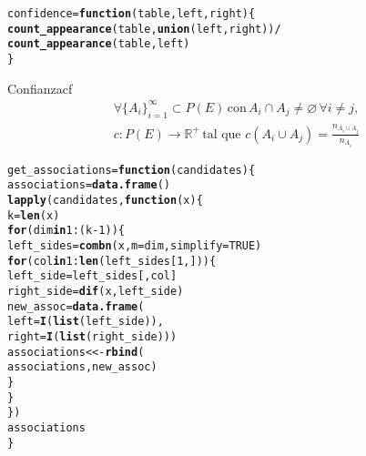 \documentclass[12pt]{report}\usepackage[]{graphicx}\usepackage[dvipsnames]{xcolor}
\makeatletter
\newcommand{\hlnum}[1]{\textcolor[rgb]{0.686,0.059,0.569}{#1}}%
\newcommand{\hlopt}[1]{\textcolor[rgb]{0,0,0}{#1}}%
\newcommand{\hlstd}[1]{\textcolor[rgb]{0.345,0.345,0.345}{#1}}%
\newcommand{\hlkwa}[1]{\textcolor[rgb]{0.161,0.373,0.58}{\textbf{#1}}}%
\newcommand{\hlkwb}[1]{\textcolor[rgb]{0.69,0.353,0.396}{#1}}%
\newcommand{\hlkwc}[1]{\textcolor[rgb]{0.333,0.667,0.333}{#1}}%
\newcommand{\hlkwd}[1]{\textcolor[rgb]{0.737,0.353,0.396}{\textbf{#1}}}%
\newenvironment{kframe}{%
 \def\at@end@of@kframe{}%
 \ifinner\ifhmode%
  \def\at@end@of@kframe{\end{minipage}}%
  \begin{minipage}{\columnwidth}%
 \fi\fi%
 \def\FrameCommand##1{\hskip\@totalleftmargin \hskip-\fboxsep
 \colorbox{shadecolor}{##1}\hskip-\fboxsep
     \hskip-\linewidth \hskip-\@totalleftmargin \hskip\columnwidth}%
 \MakeFramed {\advance\hsize-\width
   \@totalleftmargin\z@ \linewidth\hsize
   \@setminipage}}%
 {\par\unskip\endMakeFramed%
 \at@end@of@kframe}
\newenvironment{knitrout}{}{} %
\makeatother
\begin{document}
\begin{knitrout}
\color{fgcolor}\begin{kframe}
\begin{alltt}
\hlstd{confidence} \hlkwb{=} \hlkwa{function}\hlstd{(}\hlkwc{table}\hlstd{,} \hlkwc{left}\hlstd{,} \hlkwc{right}\hlstd{) \{}
        \hlkwd{count_appearance}\hlstd{(table,} \hlkwd{union}\hlstd{(left, right))} \hlopt{/}
        \hlkwd{count_appearance}\hlstd{(table, left)}
\hlstd{\}}
\end{alltt}
\end{kframe}
\end{knitrout}
			
			\begin{definicion}{Confianza}{cf}
				\begin{equation*}
					\begin{gathered}
						\forall\{A_i\}_{i=1}^\infty \subset P(E) \, \text{con} \, A_i \cap A_j \neq \varnothing \, \forall i \neq j, \\
						c: P(E) \longrightarrow \mathbb{R}^+ \, \text{tal que} \,\, c(A_i \cup A_j) = \frac{n_{A_i \cup A_j}}{n_{A_i}}
					\end{gathered}
				\end{equation*}
			\end{definicion}
			
\begin{knitrout}
\color{fgcolor}\begin{kframe}
\begin{alltt}
\hlstd{get_associations} \hlkwb{=} \hlkwa{function}\hlstd{(}\hlkwc{candidates}\hlstd{) \{}
        \hlstd{associations} \hlkwb{=} \hlkwd{data.frame}\hlstd{()}
        \hlkwd{lapply}\hlstd{(candidates,} \hlkwa{function}\hlstd{(}\hlkwc{x}\hlstd{) \{}
                \hlstd{k} \hlkwb{=} \hlkwd{len}\hlstd{(x)}
                \hlkwa{for} \hlstd{(dim} \hlkwa{in} \hlnum{1}\hlopt{:}\hlstd{(k} \hlopt{-} \hlnum{1}\hlstd{)) \{}
                        \hlstd{left_sides} \hlkwb{=} \hlkwd{combn}\hlstd{(x,} \hlkwc{m}\hlstd{=dim,} \hlkwc{simplify}\hlstd{=}\hlnum{TRUE}\hlstd{)}
                        \hlkwa{for} \hlstd{(col} \hlkwa{in} \hlnum{1}\hlopt{:}\hlkwd{len}\hlstd{(left_sides[}\hlnum{1}\hlstd{,])) \{}
                                \hlstd{left_side} \hlkwb{=} \hlstd{left_sides[, col]}
                                \hlstd{right_side} \hlkwb{=} \hlkwd{dif}\hlstd{(x, left_side)}
                                \hlstd{new_assoc} \hlkwb{=} \hlkwd{data.frame}\hlstd{(}
                                        \hlkwc{left} \hlstd{=} \hlkwd{I}\hlstd{(}\hlkwd{list}\hlstd{(left_side)),}
                                        \hlkwc{right} \hlstd{=} \hlkwd{I}\hlstd{(}\hlkwd{list}\hlstd{(right_side)))}
                                \hlstd{associations} \hlkwb{<<-} \hlkwd{rbind}\hlstd{(}
                                        \hlstd{associations, new_assoc)}
                        \hlstd{\}}
                \hlstd{\}}
        \hlstd{\})}
        \hlstd{associations}
\hlstd{\}}
\end{alltt}
\end{kframe}
\end{knitrout}
			
\end{document}
